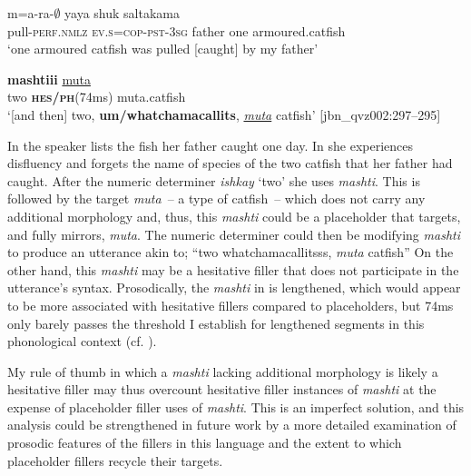 \documentclass[output=paper]{langscibook}
\begin{document}
\ea%
\label{ex:rice:12}
\ea \label{ex:rice:12a} 
 {m=a-ra-${\emptyset}$} {yaya}  {shuk}  {saltakama}\\
{pull-\textsc{perf.nmlz}} {\textsc{ev.s=cop-pst-3sg}} {father} {one}   {armoured.catfish}\\
\glt ‘one armoured catfish was pulled [caught] by my father’
\medskip

\ex \label{ex:rice:12b}
 \textbf{mashtiii} \uline{muta}\\
two   \textbf{\textsc{hes/ph}}\textsc{(74}ms)   muta.catfish\\
\glt ‘[and then] two, \textbf{um/whatchamacallits}, \textit{\uline{muta}} catfish’ [jbn\_qvz002:297--295]

\z
\z

In  the speaker lists the fish her father caught one day. In  she experiences disfluency and forgets the name of species of the two catfish that her father had caught. After the numeric determiner \textit{ishkay} ‘two’ she uses \textit{mashti}. This is followed by the target \textit{muta}~-- a type of catfish~-- which does not carry any additional morphology and, thus, this \textit{mashti} could be a placeholder that targets, and fully mirrors, \textit{muta}. The numeric determiner could then be modifying \textit{mashti} to produce an utterance akin to; “two whatchamacallitsss, \textit{muta} catfish” On the other hand, this \textit{mashti} may be a hesitative filler that does not participate in the utterance’s syntax. Prosodically, the \textit{mashti} in  is lengthened, which would appear to be more associated with hesitative fillers compared to placeholders, but 74ms only barely passes the threshold I establish for lengthened segments in this phonological context (cf. ).

My rule of thumb in which a \textit{mashti} lacking additional morphology is likely a hesitative filler may thus overcount hesitative filler instances of \textit{mashti} at the expense of placeholder filler uses of \textit{mashti}. This is an imperfect solution, and this analysis could be strengthened in future work by a more detailed examination of prosodic features of the fillers in this language and the extent to which placeholder fillers recycle their targets.
\end{document}
